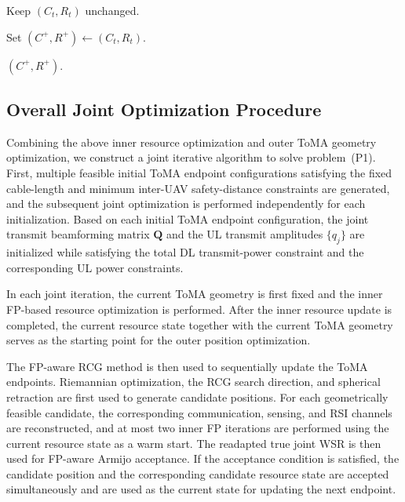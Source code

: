 \documentclass[letterpaper,journal]{IEEEtran}
\begin{document}
\begin{algorithm}[t]
\begin{algorithmic}[1]
    \ENDFOR

        \STATE Keep $(C_t,R_t)$ unchanged.
    \ENDIF

\ENDFOR

\STATE Set $(C^{+},R^{+})\leftarrow(C_t,R_t)$.

\RETURN $(C^{+},R^{+})$.

\end{algorithmic}
\end{algorithm}
\subsection{Overall Joint Optimization Procedure}
\label{subsec:overall_algorithm}

Combining the above inner resource optimization and outer ToMA geometry optimization, we construct a joint iterative algorithm to solve problem~(P1). First, multiple feasible initial ToMA endpoint configurations satisfying the fixed cable-length and minimum inter-UAV safety-distance constraints are generated, and the subsequent joint optimization is performed independently for each initialization. Based on each initial ToMA endpoint configuration, the joint transmit beamforming matrix $\mathbf Q$ and the UL transmit amplitudes $\{q_j\}$ are initialized while satisfying the total DL transmit-power constraint and the corresponding UL power constraints.

In each joint iteration, the current ToMA geometry is first fixed and the inner FP-based resource optimization is performed. After the inner resource update is completed, the current resource state together with the current ToMA geometry serves as the starting point for the outer position optimization.

The FP-aware RCG method is then used to sequentially update the ToMA endpoints. Riemannian optimization, the RCG search direction, and spherical retraction are first used to generate candidate positions. For each geometrically feasible candidate, the corresponding communication, sensing, and RSI channels are reconstructed, and at most two inner FP iterations are performed using the current resource state as a warm start. The readapted true joint WSR is then used for FP-aware Armijo acceptance. If the acceptance condition is satisfied, the candidate position and the corresponding candidate resource state are accepted simultaneously and are used as the current state for updating the next endpoint.
\end{document}
